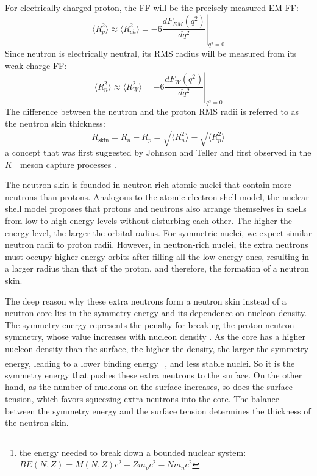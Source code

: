 For electrically charged proton, the FF will be the precisely measured EM FF:
\begin{equation}
    \langle R_p^2 \rangle \approx \langle R_{ch}^2 \rangle= -6 \left. \frac{dF_{EM}(q^2)}{dq^2} \right|_{q^2 = 0}
\end{equation}
Since neutron is electrically neutral, its RMS radius will be measured from its weak charge FF:
\begin{equation}
    \langle R_n^2 \rangle \approx \langle R_W^2 \rangle = -6 \left. \frac{dF_{W}(q^2)}{dq^2} \right|_{q^2 = 0}
\end{equation}
The difference between the neutron and the proton RMS radii is referred to as the neutron skin thickness:
\begin{equation}
    R_{\text{skin}} = R_n - R_p = \sqrt{\langle R_n^2 \rangle} - \sqrt{\langle R_p^2 \rangle}
\end{equation}
a concept that was first suggested by Johnson and Teller \cite{PhysRev.93.357}
and first observed in the $K^-$ meson capture processes \cite{BURHOP1969625}.

The neutron skin is founded in neutron-rich atomic nuclei that contain more
neutrons than protons. Analogous to the atomic electron shell model, the nuclear
shell model proposes that protons and neutrons also arrange themselves in
shells from low to high energy levels without disturbing each other.
The higher the energy level, the larger the orbital radius.
For symmetric nuclei, we expect similar neutron radii to proton radii. 
However, in neutron-rich nuclei, the extra neutrons must occupy 
higher energy orbits after filling all the low energy ones, resulting in
a larger radius than that of the proton, and therefore, the formation of a neutron skin.

The deep reason why these extra neutrons form a neutron skin instead of
a neutron core lies in the symmetry energy and its dependence on nucleon density. 
The symmetry energy represents the penalty for breaking the proton-neutron symmetry,
whose value increases with nucleon density \cite{10.3389/fphy.2019.00213}.
As the core has a higher nucleon density than the surface, the higher the density, 
the larger the symmetry energy, leading to a lower binding energy
\footnote{the energy needed to break down a bounded nuclear system: $BE(N, Z) = M(N, Z)c^2 - Zm_p c^2 - Nm_n c^2$}, 
and less stable nuclei. So it is the symmetry energy that pushes these extra neutrons to 
the surface. On the other hand, as the number of nucleons on the surface increases, 
so does the surface tension, which favors squeezing extra neutrons %
into the core. The balance between the symmetry energy and 
the surface tension determines the thickness of the neutron skin.


